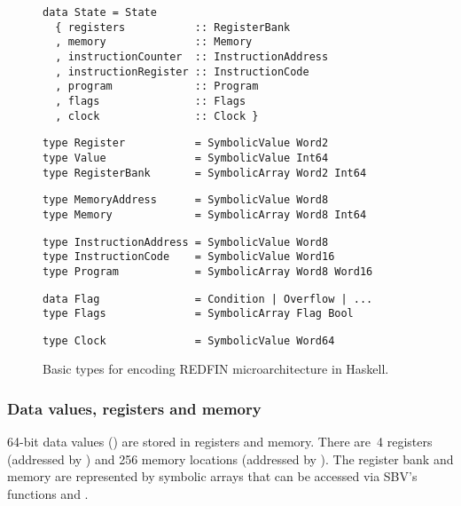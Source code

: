 \begin{figure}[t]

\begin{verbatim}
data State = State
  { registers           :: RegisterBank
  , memory              :: Memory
  , instructionCounter  :: InstructionAddress
  , instructionRegister :: InstructionCode
  , program             :: Program
  , flags               :: Flags
  , clock               :: Clock }
\end{verbatim}

\begin{verbatim}
type Register           = SymbolicValue Word2
type Value              = SymbolicValue Int64
type RegisterBank       = SymbolicArray Word2 Int64
\end{verbatim}

\begin{verbatim}
type MemoryAddress      = SymbolicValue Word8
type Memory             = SymbolicArray Word8 Int64
\end{verbatim}

\begin{verbatim}
type InstructionAddress = SymbolicValue Word8
type InstructionCode    = SymbolicValue Word16
type Program            = SymbolicArray Word8 Word16
\end{verbatim}

\begin{verbatim}
data Flag               = Condition | Overflow | ...
type Flags              = SymbolicArray Flag Bool
\end{verbatim}

\begin{verbatim}
type Clock              = SymbolicValue Word64
\end{verbatim}

\caption{Basic types for encoding REDFIN microarchitecture in Haskell.\label{fig-types}}

\end{figure}


\subsubsection{Data values, registers and memory}
64-bit data values () are stored in registers and memory. There are~4
registers (addressed by ) and 256 memory locations (addressed by
). The register bank and memory are represented by symbolic arrays that can be
accessed via SBV's functions  and .


